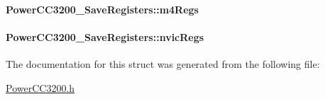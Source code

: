 \paragraph[{m4\+Regs}]{ Power\+C\+C3200\+\_\+\+Save\+Registers\+::m4\+Regs}\label{struct_power_c_c3200___save_registers_a94901ff1c1321554292e8cc85a3299b8}
\paragraph[{nvic\+Regs}]{ Power\+C\+C3200\+\_\+\+Save\+Registers\+::nvic\+Regs}\label{struct_power_c_c3200___save_registers_a1880ad32c749419af188547e05bcbef9}


The documentation for this struct was generated from the following file\+:\begin{DoxyCompactItemize}
\item 
\hyperlink{_power_c_c3200_8h}{Power\+C\+C3200.\+h}\end{DoxyCompactItemize}
